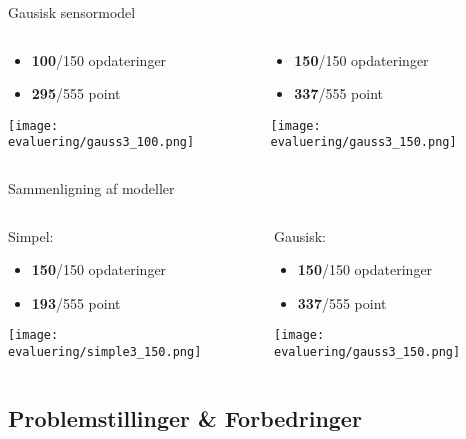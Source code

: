 \begin{frame}[fragile]{Gausisk sensormodel}
	\begin{columns}
		\begin{column}{0.5\textwidth}
			\begin{itemize}
			\item \textbf{100}/150 opdateringer
			\item \textbf{295}/555 point
			\end{itemize}
			\texttt{[image: evaluering/gauss3\_100.png]}
		\end{column}
		{\begin{column}{0.5\textwidth}
			\begin{itemize}
			\item \textbf{150}/150 opdateringer
			\item \textbf{337}/555 point
			\end{itemize}
			\texttt{[image: evaluering/gauss3\_150.png]}
		\end{column}}
\end{columns}
\end{frame}

\begin{frame}[fragile]{Sammenligning af modeller}
	\begin{columns}
		\begin{column}{0.5\textwidth}
			Simpel:
			\begin{itemize}
			\item \textbf{150}/150 opdateringer
			\item \textbf{193}/555 point
			\end{itemize}
			\texttt{[image: evaluering/simple3\_150.png]}
		\end{column}
		\begin{column}{0.5\textwidth}
			Gausisk:
			\begin{itemize}
			\item \textbf{150}/150 opdateringer
			\item \textbf{337}/555 point
			\end{itemize}
			\texttt{[image: evaluering/gauss3\_150.png]}
		\end{column}
\end{columns}
\end{frame}

\subsection{Problemstillinger \& Forbedringer}

